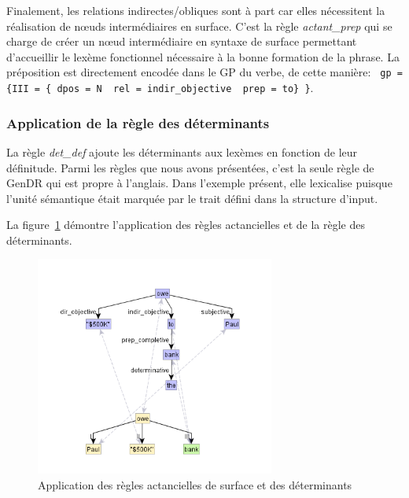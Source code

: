 Finalement, les relations indirectes/obliques sont à part car elles nécessitent la réalisation de n\oe{}uds intermédiaires en surface. C'est la règle \emph{actant\_prep} qui se charge de créer un n\oe{}ud intermédiaire en syntaxe de surface permettant d'accueillir le lexème fonctionnel nécessaire à la bonne formation de la phrase. La préposition est directement encodée dans le \ac{GP} du verbe, de cette manière: \lstinline! gp = {III = { dpos = N  rel = indir_objective  prep = to} }!.

\subsubsection{Application de la règle des déterminants}

La règle \emph{det\_def} ajoute les déterminants aux lexèmes en fonction de leur définitude. Parmi les règles que nous avons présentées, c'est la seule règle de GenDR qui est propre à l'anglais. Dans l'exemple présent, elle lexicalise  puisque l'unité sémantique  était marquée par le trait défini dans la structure d'input.

La figure~\ref{fig:syntsurf} démontre l'application des règles actancielles et de la règle des déterminants.

\begin{figure}[htb]
	\centering
	\includegraphics[width=0.7\textwidth, trim = {0cm 8mm 0cm 15mm},clip]{ch3/figs/rsynts_syntactisation.png}
	\caption{Application des règles actancielles de surface et des déterminants}
	\label{fig:syntsurf}
\end{figure}



